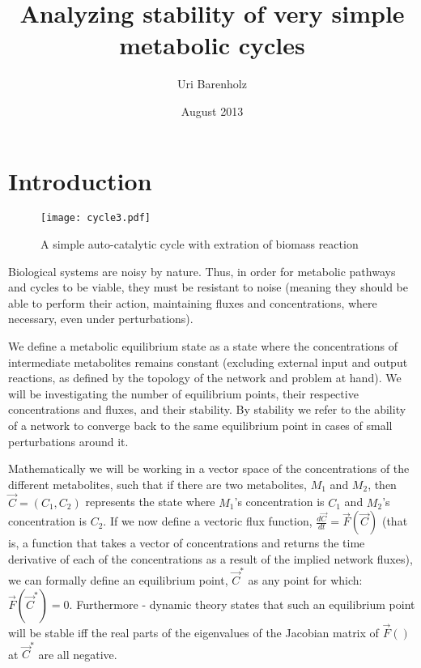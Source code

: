 \documentclass[a4page,notitlepage]{article}
\title{Analyzing stability of very simple metabolic cycles}
\author{Uri Barenholz}
\date{August 2013}
\begin{document}
\section{Introduction}
\begin{figure}[h]
\centering
\texttt{[image: cycle3.pdf]}
\caption{A simple auto-catalytic cycle with extration of biomass reaction}
\label{fig:autocatal}
\end{figure}
Biological systems are noisy by nature.
Thus, in order for metabolic pathways and cycles to be viable, they must be resistant to noise (meaning they should be able to perform their action, maintaining fluxes and concentrations, where necessary, even under perturbations).

We define a metabolic equilibrium state as a state where the concentrations of intermediate metabolites remains constant (excluding external input and output reactions, as defined by the topology of the network and problem at hand).
We will be investigating the number of equilibrium points, their respective concentrations and fluxes, and their stability.
By stability we refer to the ability of a network to converge back to the same equilibrium point in cases of small perturbations around it.

Mathematically we will be working in a vector space of the concentrations of the different metabolites, such that if there are two metabolites, $M_1$ and $M_2$, then $\vec{C}=(C_1,C_2)$ represents the state where $M_1$'s concentration is $C_1$ and $M_2$'s concentration is $C_2$.
If we now define a vectoric flux function, $\frac{d\vec{C}}{dt}=\vec{F}(\vec{C})$ (that is, a function that takes a vector of concentrations and returns the time derivative of each of the concentrations as a result of the implied network fluxes), we can formally define an equilibrium point, $\vec{C}^*$ as any point for which: $\vec{F}(\vec{C}^*)=0$.
Furthermore - dynamic theory states that such an equilibrium point will be stable iff the real parts of the eigenvalues of the Jacobian matrix of $\vec{F}()$ at $\vec{C}^*$ are all negative.
\end{document}
